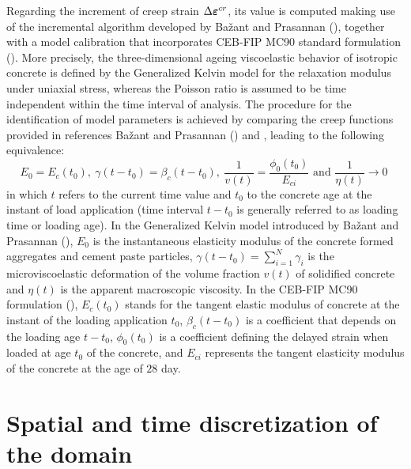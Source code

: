 \documentclass[Journal,letterpaper, NoLists,SectionNumbers]{ascelike-new}
\begin{document}
Regarding the increment of creep strain $\Delta \boldsymbol{\varepsilon}^{cr}$, its value is computed making use of the incremental algorithm developed by Bažant and Prasannan (), together with a model calibration that incorporates CEB-FIP MC90 standard formulation (). More precisely, the three-dimensional ageing viscoelastic behavior of isotropic concrete is defined by the Generalized Kelvin model for the relaxation modulus under uniaxial stress, whereas the Poisson ratio is assumed to be time independent within the time interval of analysis. The procedure for the identification of model parameters is achieved by comparing the creep functions provided in references Bažant and Prasannan () and , leading to the following equivalence:
\begin{equation} \label{eq:11}
	E_0 = E_c(t_0),~ \gamma(t-t_0)=\beta_c(t-t_0),~ \frac{1}{v(t)} = \frac{\phi_0(t_0)}{E_{ci}} \text{  and  } \frac{1}{\eta(t)} \to 0 \;
\end{equation}
in which $t$ refers to the current time value and $t_0$ to the concrete age at the instant of load application (time interval $t-t_0$ is generally referred to as loading time or loading age). In the Generalized Kelvin model introduced by Bažant and Prasannan (), $E_0$ is the instantaneous elasticity modulus of the concrete formed aggregates and cement paste particles, $\gamma(t-t_0) = \sum\limits_{i=1}^{N}\gamma_i$ is the microviscoelastic deformation of the volume fraction $v(t)$ of solidified concrete and $\eta(t)$ is the apparent macroscopic viscosity. In the CEB-FIP MC90 formulation (), $E_c(t_0)$ stands for the tangent elastic modulus of concrete at the instant of the loading application $t_0$, $\beta_c(t-t_0)$ is a coefficient that depends on the loading age $t-t_0$, $\phi_0(t_0)$ is a coefficient defining the delayed strain when loaded at age $t_0$ of the concrete, and $E_{ci}$ represents the tangent elasticity modulus of the concrete at the age of $28$ day.

\section{Spatial and time discretization of the domain}\label{section_spatial}
\end{document}

